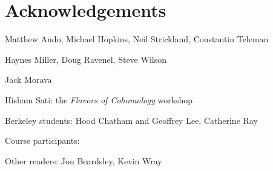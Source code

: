 
\section*{Acknowledgements}

Matthew Ando, Michael Hopkins, Neil Strickland, Constantin Teleman

Haynes Miller, Doug Ravenel, Steve Wilson

Jack Morava



Hisham Sati: the \textit{Flavors of Cohomology} workshop

Berkeley students: Hood Chatham and Geoffrey Lee, Catherine Ray

Course participants:

Other readers: Jon Beardsley, Kevin Wray
